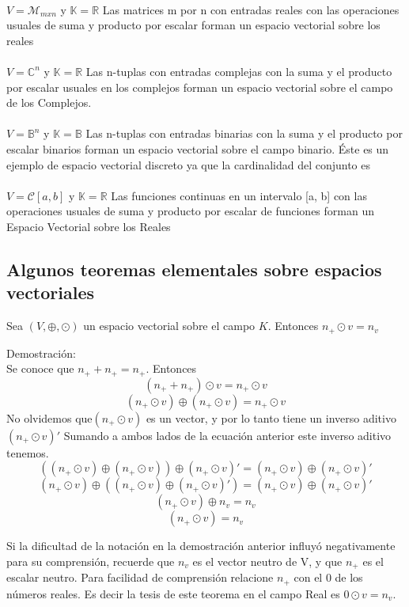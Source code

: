 ~\\
$V=\mathcal{M}_{mxn}$
y $\mathbb{K}=\mathbb{R}$
Las matrices m por n con entradas reales con las operaciones usuales
de suma y producto por escalar forman un espacio vectorial sobre los reales
~\\\\
$V=\mathbb{C}^n$
y $\mathbb{K}=\mathbb{R}$
Las n-tuplas con entradas complejas con la suma y el producto por escalar
usuales en los complejos forman un espacio vectorial sobre el campo de los Complejos.
~\\\\
$V=\mathbb{B}^n$
y $\mathbb{K}=\mathbb{B}$
Las n-tuplas con entradas binarias con la suma y el producto por escalar
binarios forman un espacio vectorial sobre el campo binario. Éste es un ejemplo de espacio
vectorial discreto ya que la cardinalidad del conjunto es
~\\\\
$V=\mathcal{C}[a,b]$
y $\mathbb{K}=\mathbb{R}$
Las funciones continuas en un intervalo [a, b] con las operaciones
usuales de suma y producto por escalar de funciones forman un Espacio Vectorial sobre los
Reales
\subsection{Algunos teoremas elementales sobre espacios vectoriales}
\begin{theorem}
Sea $(V,\oplus,\odot)$ un espacio vectorial sobre el campo $K$. Entonces $n_+\odot v=n_v$
\end{theorem}
Demostración:
~\\

Se conoce que $n_+ + n_+=n_+$. Entonces
\[(n_++n_+ )\odot v=n_+\odot v\]
\[(n_+\odot v)\oplus (n_+\odot v)=n_+\odot v\]
No olvidemos que$ (n_+\odot v)$ es un vector, y por lo tanto tiene un inverso aditivo $(n_+\odot v)'$
Sumando a ambos lados de la ecuación anterior este inverso aditivo tenemos.
$$((n_+\odot v)\oplus (n_+\odot v))\oplus (n_+\odot v)'=(n_+\odot v)\oplus (n_+\odot v)'$$
$$(n_+\odot v)\oplus ((n_+\odot v)\oplus (n_+\odot v)' )=(n_+\odot v)\oplus (n_+\odot v)'$$
$$(n_+\odot v)\oplus n_v=n_v$$
$$(n_+\odot v)=n_v$$

Si la dificultad de la notación en la demostración anterior influyó negativamente para su comprensión, recuerde que $ n_v$ es el vector neutro de V, y que $n_+$ es el escalar neutro. Para facilidad de comprensión relacione $n_+$ con el 0 de los números reales. Es decir la tesis de este teorema en el campo Real es $0\odot v=n_v$.



